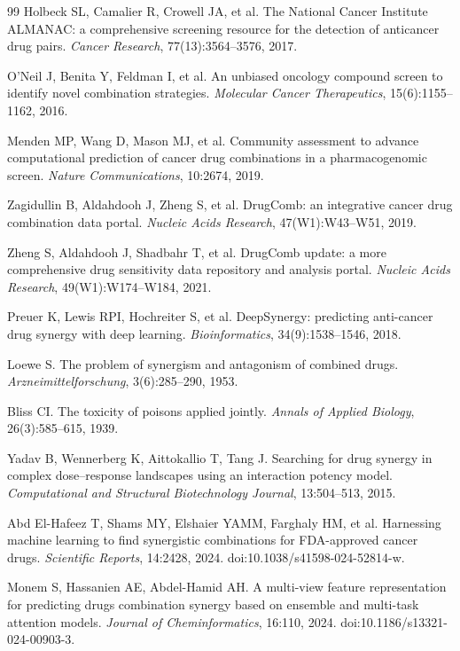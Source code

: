 \documentclass[11pt]{article}
\begin{document}
\begin{thebibliography}{99}
\small
{} Holbeck SL, Camalier R, Crowell JA, et al.
The National Cancer Institute ALMANAC: a comprehensive screening resource for the detection of
anticancer drug pairs. \textit{Cancer Research}, 77(13):3564--3576, 2017.

 O'Neil J, Benita Y, Feldman I, et al.
An unbiased oncology compound screen to identify novel combination strategies.
\textit{Molecular Cancer Therapeutics}, 15(6):1155--1162, 2016.

 Menden MP, Wang D, Mason MJ, et al.
Community assessment to advance computational prediction of cancer drug combinations in a
pharmacogenomic screen. \textit{Nature Communications}, 10:2674, 2019.

 Zagidullin B, Aldahdooh J, Zheng S, et al.
DrugComb: an integrative cancer drug combination data portal.
\textit{Nucleic Acids Research}, 47(W1):W43--W51, 2019.

 Zheng S, Aldahdooh J, Shadbahr T, et al.
DrugComb update: a more comprehensive drug sensitivity data repository and analysis portal.
\textit{Nucleic Acids Research}, 49(W1):W174--W184, 2021.

 Preuer K, Lewis RPI, Hochreiter S, et al.
DeepSynergy: predicting anti-cancer drug synergy with deep learning.
\textit{Bioinformatics}, 34(9):1538--1546, 2018.

 Loewe S.
The problem of synergism and antagonism of combined drugs.
\textit{Arzneimittelforschung}, 3(6):285--290, 1953.

 Bliss CI.
The toxicity of poisons applied jointly.
\textit{Annals of Applied Biology}, 26(3):585--615, 1939.

 Yadav B, Wennerberg K, Aittokallio T, Tang J.
Searching for drug synergy in complex dose--response landscapes using an interaction potency model.
\textit{Computational and Structural Biotechnology Journal}, 13:504--513, 2015.

 Abd El-Hafeez T, Shams MY, Elshaier YAMM, Farghaly HM, et al.
Harnessing machine learning to find synergistic combinations for FDA-approved cancer drugs.
\textit{Scientific Reports}, 14:2428, 2024. doi:10.1038/s41598-024-52814-w.

 Monem S, Hassanien AE, Abdel-Hamid AH.
A multi-view feature representation for predicting drugs combination synergy based on ensemble and
multi-task attention models. \textit{Journal of Cheminformatics}, 16:110, 2024.
doi:10.1186/s13321-024-00903-3.


\end{thebibliography}
\end{document}
